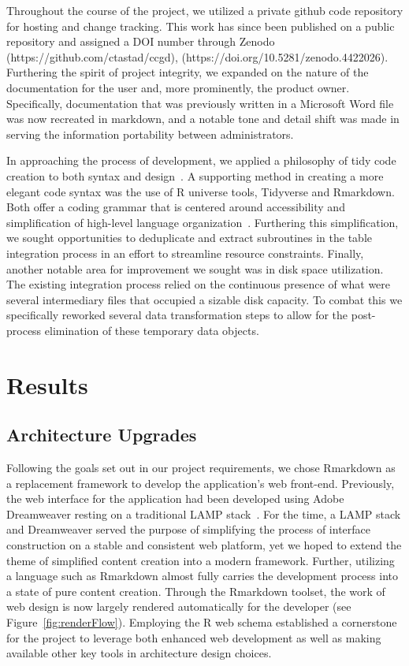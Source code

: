 \documentclass[10pt]{report}
\begin{document}
Throughout the course of the project, we utilized a private github code repository for hosting and change tracking. This work has since been published on a public repository and assigned a DOI number through Zenodo (https://github.com/ctastad/ccgd), (https://doi.org/10.5281/zenodo.4422026). Furthering the spirit of project integrity, we expanded on the nature of the documentation for the user and, more prominently, the product owner. Specifically, documentation that was previously written in a Microsoft Word file was now recreated in markdown, and a notable tone and detail shift was made in serving the information portability between administrators.

In approaching the process of development, we applied a philosophy of tidy code creation to both syntax and design~\cite{wickhamDplyrGrammarData2021}. A supporting method in creating a more elegant code syntax was the use of R universe tools, Tidyverse and Rmarkdown. Both offer a coding grammar that is centered around accessibility and simplification of high-level language organization~\cite{wickhamWelcomeTidyverse2019}. Furthering this simplification, we sought opportunities to deduplicate and extract subroutines in the table integration process in an effort to streamline resource constraints. Finally, another notable area for improvement we sought was in disk space utilization. The existing integration process relied on the continuous presence of what were several intermediary files that occupied a sizable disk capacity. To combat this we specifically reworked several data transformation steps to allow for the post-process elimination of these temporary data objects.

\section{Results}

\subsection{Architecture Upgrades}
Following the goals set out in our project requirements, we chose Rmarkdown as a replacement framework to develop the application's web front-end. Previously, the web interface for the application had been developed using Adobe Dreamweaver resting on a traditional LAMP stack~\cite{abbottCandidateCancerGene2015a}. For the time, a LAMP stack and Dreamweaver served the purpose of simplifying the process of interface construction on a stable and consistent web platform, yet we hoped to extend the theme of simplified content creation into a modern framework. Further, utilizing a language such as Rmarkdown almost fully carries the development process into a state of pure content creation. Through the Rmarkdown toolset, the work of web design is now largely rendered automatically for the developer (see Figure~\ref{fig:renderFlow}). Employing the R web schema established a cornerstone for the project to leverage both enhanced web development as well as making available other key tools in architecture design choices.
\end{document}
